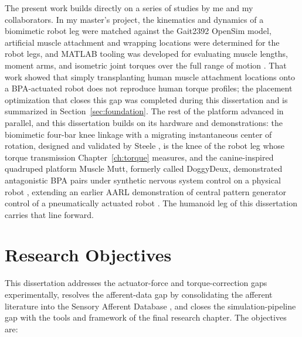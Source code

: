 The present work builds directly on a series of studies by me and my collaborators. In my master's project, the kinematics and dynamics of a biomimetic robot leg were matched against the Gait2392 OpenSim model, artificial muscle attachment and wrapping locations were determined for the robot legs, and MATLAB tooling was developed for evaluating muscle lengths, moment arms, and isometric joint torques over the full range of motion \citep{bolen_bipedal_2019, bolen_determination_2019}. That work showed that simply transplanting human muscle attachment locations onto a BPA-actuated robot does not reproduce human torque profiles; the placement optimization that closes this gap was completed during this dissertation and is summarized in Section~\ref{sec:foundation}. The rest of the platform advanced in parallel, and this dissertation builds on its hardware and demonstrations: the biomimetic four-bar knee linkage with a migrating instantaneous center of rotation, designed and validated by Steele \citep{steele_development_2017, steele_biomimetic_2018, steele_biomimetic_2018-1}, is the knee of the robot leg whose torque transmission Chapter~\ref{ch:torque} measures, and the canine-inspired quadruped platform Muscle Mutt, formerly called DoggyDeux, demonstrated antagonistic BPA pairs under synthetic nervous system control on a physical robot \citep{scharzenberger_design_2019}, extending an earlier AARL demonstration of central pattern generator control of a pneumatically actuated robot \citep{hunt_development_2017}. The humanoid leg of this dissertation carries that line forward.

\section{Research Objectives}\label{sec:objectives}

This dissertation addresses the actuator-force and torque-correction gaps experimentally, resolves the afferent-data gap by consolidating the afferent literature into the Sensory Afferent Database \citep{bolen_sensory_2023, bolen_using_2024}, and closes the simulation-pipeline gap with the tools and framework of the final research chapter. The objectives are:

